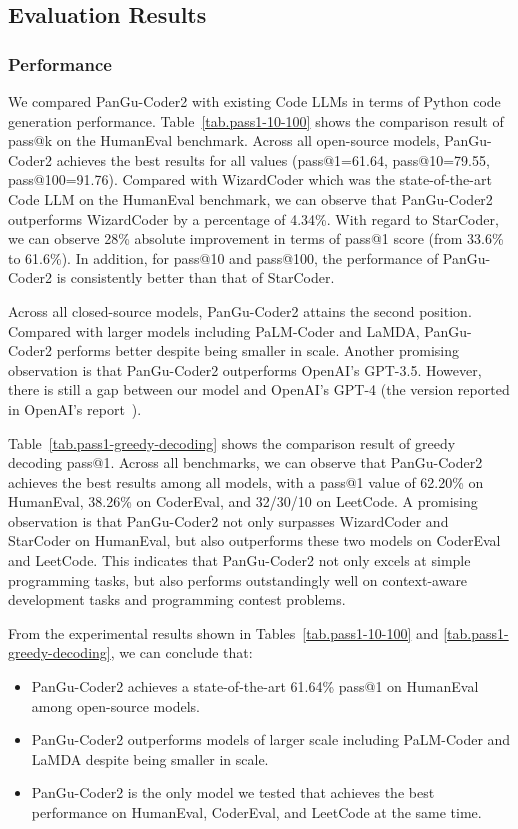 \documentclass{article}
\newcommand{\pgcoder}{PanGu-Coder2\xspace}
\begin{document}
\subsection{Evaluation Results}

\subsubsection{Performance}
We compared \pgcoder with existing Code LLMs in terms of Python code generation performance. 
Table~\ref{tab.pass1-10-100} shows the comparison result of pass@k on the HumanEval benchmark. Across all open-source models, \pgcoder achieves the best results for all  values (pass@1=61.64, pass@10=79.55, pass@100=91.76). Compared with WizardCoder which was the state-of-the-art Code LLM on the HumanEval benchmark, we can observe that \pgcoder outperforms WizardCoder by a percentage of 4.34\%. 
With regard to StarCoder, we can observe 28\% absolute improvement in terms of pass@1 score (from 33.6\% to 61.6\%). In addition, for pass@10 and pass@100, the performance of \pgcoder is consistently better than that of StarCoder. 

Across all closed-source models, \pgcoder attains the second position. Compared with larger models including PaLM-Coder and LaMDA, \pgcoder performs better despite being smaller in scale. Another promising observation is that \pgcoder outperforms OpenAI's GPT-3.5. However, there is still a gap between our model and OpenAI's GPT-4 (the version reported in OpenAI's report~\cite{gpt4-report}).

Table~\ref{tab.pass1-greedy-decoding} shows the comparison result of greedy decoding pass@1. Across all benchmarks, we can observe that \pgcoder achieves the best results among all models, with a pass@1 value of 62.20\% on HumanEval, 38.26\% on CoderEval, and 32/30/10 on LeetCode. A promising observation is that \pgcoder not only surpasses WizardCoder and StarCoder on HumanEval, but also outperforms these two models on CoderEval and LeetCode. This indicates that \pgcoder not only excels at simple programming tasks, but also performs outstandingly well on context-aware development tasks and programming contest problems. 

From the experimental results shown in Tables~\ref{tab.pass1-10-100} and \ref{tab.pass1-greedy-decoding}, we can conclude that:
\begin{itemize}
    \item \pgcoder achieves a state-of-the-art 61.64\% pass@1 on HumanEval among open-source models.
    \item \pgcoder outperforms models of larger scale including PaLM-Coder and LaMDA despite being smaller in scale.
    \item \pgcoder is the only model we tested that achieves the best performance on HumanEval, CoderEval, and LeetCode at the same time.
\end{itemize}
\end{document}

